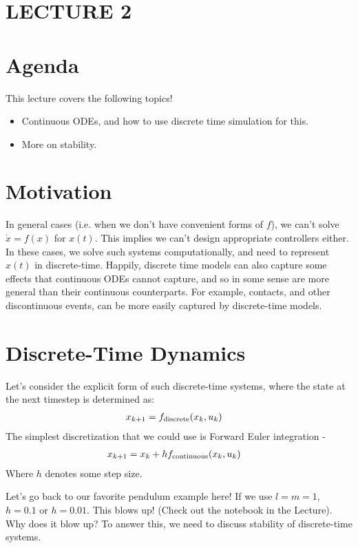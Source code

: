 \newpage
\section*{LECTURE 2}
\section{Agenda}

This lecture covers the following topics!
\begin{itemize}
    \item Continuous ODEs, and how to use discrete time simulation for this.
    \item More on stability.
\end{itemize}

\section{Motivation}
In general cases (i.e. when we don't have convenient forms of $f$), we can't solve $\dot{x} = f(x)$ for $x(t)$.
This implies we can't design appropriate controllers either.
In these cases, we solve such systems computationally, and need to represent $x(t)$ in discrete-time.
Happily, discrete time models can also capture some effects that continuous ODEs cannot capture, and so in some sense are more general than their continuous counterparts. For example, contacts, and other discontinuous events, can be more easily captured by discrete-time models.

\section{Discrete-Time Dynamics}
Let's consider the explicit form of such discrete-time systems, where the state at the next timestep is determined as:
\begin{align}
    x_{k+1} &= f_{\rm discrete} (x_k, u_k)
\end{align}
The simplest discretization that we could use is Forward Euler integration -
\begin{align}
    x_{k+1} &= x_k + h f_{\rm continuous} (x_k, u_k)
\end{align}
Where $h$ denotes some step size.

\noindent
Let's go back to our favorite pendulum example here! If we use $l=m=1$, $h=0.1$ or $h=0.01$.
This blows up! (Check out the notebook in the Lecture). Why does it blow up?
To answer this, we need to discuss stability of discrete-time systems.

